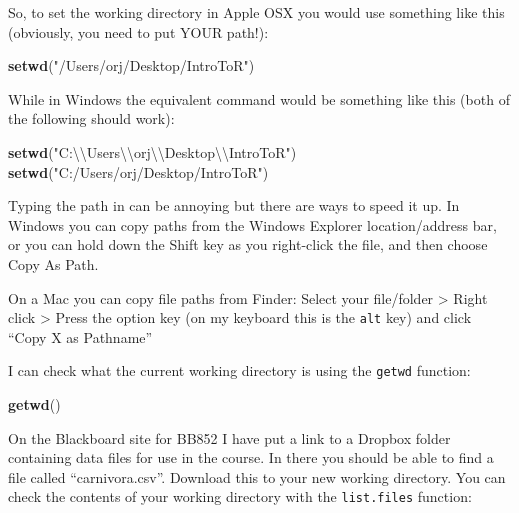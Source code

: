 \documentclass[
  a4paperpaper,
]{book}
\newenvironment{Shaded}{\begin{snugshade}}{\end{snugshade}}
\newcommand{\CharTok}[1]{\textcolor[rgb]{0.31,0.60,0.02}{#1}}
\newcommand{\KeywordTok}[1]{\textcolor[rgb]{0.13,0.29,0.53}{\textbf{#1}}}
\newcommand{\NormalTok}[1]{#1}
\newcommand{\StringTok}[1]{\textcolor[rgb]{0.31,0.60,0.02}{#1}}
\begin{document}
So, to set the working directory in Apple OSX you would use something like this (obviously, you need to put YOUR path!):

\begin{Shaded}
\begin{Highlighting}[]
\KeywordTok{setwd}\NormalTok{(}\StringTok{"/Users/orj/Desktop/IntroToR"}\NormalTok{)}
\end{Highlighting}
\end{Shaded}

While in Windows the equivalent command would be something like this (both of the following should work):

\begin{Shaded}
\begin{Highlighting}[]
\KeywordTok{setwd}\NormalTok{(}\StringTok{"C:}\CharTok{\textbackslash{}\textbackslash{}}\StringTok{Users}\CharTok{\textbackslash{}\textbackslash{}}\StringTok{orj}\CharTok{\textbackslash{}\textbackslash{}}\StringTok{Desktop}\CharTok{\textbackslash{}\textbackslash{}}\StringTok{IntroToR"}\NormalTok{)}
\KeywordTok{setwd}\NormalTok{(}\StringTok{"C:/Users/orj/Desktop/IntroToR"}\NormalTok{)}
\end{Highlighting}
\end{Shaded}

Typing the path in can be annoying but there are ways to speed it up. In Windows you can copy paths from the Windows Explorer location/address bar, or you can hold down the Shift key as you right-click the file, and then choose Copy As Path.

On a Mac you can copy file paths from Finder: Select your file/folder \textgreater{} Right click \textgreater{} Press the option key (on my keyboard this is the \texttt{alt} key) and click ``Copy X as Pathname''

I can check what the current working directory is using the \texttt{getwd} function:

\begin{Shaded}
\begin{Highlighting}[]
\KeywordTok{getwd}\NormalTok{()}
\end{Highlighting}
\end{Shaded}

On the Blackboard site for BB852 I have put a link to a Dropbox folder containing data files for use in the course. In there you should be able to find a file called ``carnivora.csv''. Download this to your new working directory. You can check the contents of your working directory with the \texttt{list.files} function:
\end{document}
